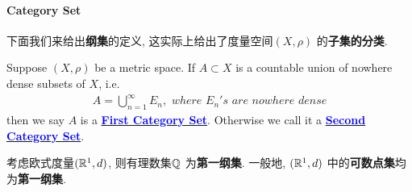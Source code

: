 \newpage

\paragraph{Category Set}
	下面我们来给出\textbf{纲集}的定义, 这实际上给出了度量空间$(X , \rho)$ 的\textbf{子集的分类}.
	\begin{defn}\label{def 1.2.5}
		Suppose $(X , \rho)$ be a metric space. If $A \subset X$ is a countable union of nowhere dense subsets of $X$, i.e.
		\begin{align}
			A = \bigcup_{n = 1}^{\infty}{E_n} , \,\, where \,\, E_n's \,\, are \,\, nowhere \,\, dense
		\end{align}
		then we say $A$ is a \underline{\textcolor{blue}{\textbf{First Category Set}}}. Otherwise we call it a \underline{\textcolor{blue}{\textbf{Second Category Set}}}.
		
		\vspace{2em}
		
		\begin{example}\label{ex 1.2.3}
			考虑欧式度量$(\mathbb{R}^1 , d)$, 则有理数集$\mathbb{Q}$ 为\textbf{第一纲集}. 一般地, $(\mathbb{R}^1 , d)$ 中的\textbf{可数点集}均为\textbf{第一纲集}.
		\end{example}
	\end{defn}
	
	\vspace{6em}
	
